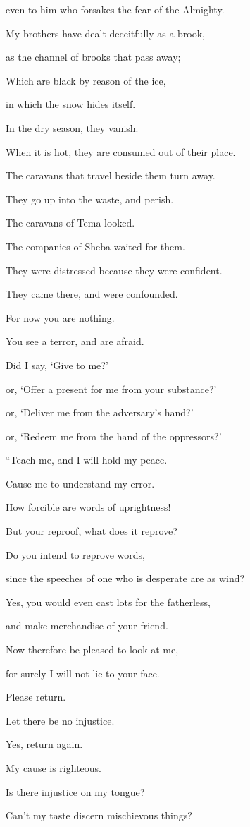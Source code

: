 {\par }{\QB even to him who forsakes the fear of the Almighty.
\par }{\Q {}My brothers have dealt deceitfully as a brook,
\par }{\QB as the channel of brooks that pass away;
\par }{\Q {}Which are black by reason of the ice,
\par }{\QB in which the snow hides itself.
\par }{\Q {}In the dry season, they vanish.
\par }{\QB When it is hot, they are consumed out of their place.
\par }{\Q {}The caravans that travel beside them turn away.
\par }{\QB They go up into the waste, and perish.
\par }{\Q {}The caravans of Tema looked.
\par }{\QB The companies of Sheba waited for them.
\par }{\Q {}They were distressed because they were confident.
\par }{\QB They came there, and were confounded.
\par }{\Q {}For now you are nothing.
\par }{\QB You see a terror, and are afraid.
\par }{\Q {}Did I say, ‘Give to me?’
\par }{\QB or, ‘Offer a present for me from your substance?’
\par }{\Q {}or, ‘Deliver me from the adversary’s hand?’
\par }{\QB or, ‘Redeem me from the hand of the oppressors?’
\par }{\BB \par }{\Q {}“Teach me, and I will hold my peace.
\par }{\QB Cause me to understand my error.
\par }{\Q {}How forcible are words of uprightness!
\par }{\QB But your reproof, what does it reprove?
\par }{\Q {}Do you intend to reprove words,
\par }{\QB since the speeches of one who is desperate are as wind?
\par }{\Q {}Yes, you would even cast lots for the fatherless,
\par }{\QB and make merchandise of your friend.
\par }{\Q {}Now therefore be pleased to look at me,
\par }{\QB for surely I will not lie to your face.
\par }{\Q {}Please return.
\par }{\QB Let there be no injustice.
\par }{\QB Yes, return again.
\par }{\QB My cause is righteous.
\par }{\Q {}Is there injustice on my tongue?
\par }{\QB Can’t my taste discern mischievous things?

}
